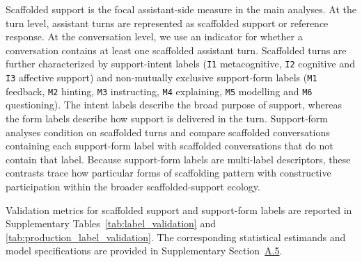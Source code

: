 Scaffolded support is the focal assistant-side measure in the main analyses. At the turn level, assistant turns are represented as scaffolded support or reference response. At the conversation level, we use an indicator for whether a conversation contains at least one scaffolded assistant turn. Scaffolded turns are further characterized by support-intent labels (\texttt{I1} metacognitive, \texttt{I2} cognitive and \texttt{I3} affective support) and non-mutually exclusive support-form labels (\texttt{M1} feedback, \texttt{M2} hinting, \texttt{M3} instructing, \texttt{M4} explaining, \texttt{M5} modelling and \texttt{M6} questioning).
The intent labels describe the broad purpose of support, whereas the form labels describe how support is delivered in the turn.
Support-form analyses condition on scaffolded turns and compare scaffolded conversations containing each support-form label with scaffolded conversations that do not contain that label. Because support-form labels are multi-label descriptors, these contrasts trace how particular forms of scaffolding pattern with constructive participation within the broader scaffolded-support ecology.

 Validation metrics for scaffolded support and support-form labels are reported in Supplementary Tables~\ref{tab:label_validation} and \ref{tab:production_label_validation}. The corresponding statistical estimands and model specifications are provided in Supplementary Section~\hyperref[supp:a5]{A.5}.




